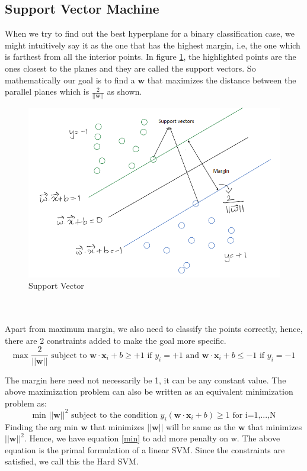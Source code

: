 \documentclass[11pt]{article}
\begin{document}
\subsection{Support Vector Machine}
When we try to find out the best hyperplane for a binary classification case, we might intuitively say it as the one that has the highest margin, i.e, the one which is farthest from all the interior points. In figure \ref{fig:SV1}, the highlighted points are the ones closest to the planes and they are called the support vectors. So mathematically our goal is to find a $\mathbf{w}$ that maximizes the distance between the parallel planes which is $\frac{2}{||\mathbf{w}||}$ as shown. 
\begin{figure}[h!]
    \centering
  \includegraphics[scale=0.7]{fig4.PNG}
  \caption{Support Vector}
  \label{fig:SV1}
\end{figure}
\\
\\Apart from maximum margin, we also need to classify the points correctly, hence, there are 2 constraints added to make the goal more specific.
\begin{equation}\label{max}
    \text{max }\frac{2}{||\mathbf{w}||} \text{ subject to } \mathbf{w}\cdot\mathbf{x}_i+b\geq +1 \text{ if } y_i=+1 \text{ and } \mathbf{w}\cdot\mathbf{x}_i+b\leq -1 \text{ if } y_i=-1
\end{equation}

The margin here need not necessarily be 1, it can be any constant value. The above maximization problem can also be written as an equivalent minimization problem as:
\begin{equation}\label{min}
    \text{min }||\mathbf{w}||^2 \text{ subject to the condition } y_i(\mathbf{w}\cdot\mathbf{x}_{i}+b)\geq1 \text{ for i=1,...,N}
\end{equation}
Finding the arg min $\mathbf{w}$ that minimizes $||\mathbf{w}||$ will be same as the $\mathbf{w}$ that minimizes $||\mathbf{w}||^2$. Hence, we have equation {\ref{min}} to add more penalty on w. The above equation is the primal formulation of a linear SVM. Since the constraints are satisfied, we call this the Hard SVM.
\end{document}
